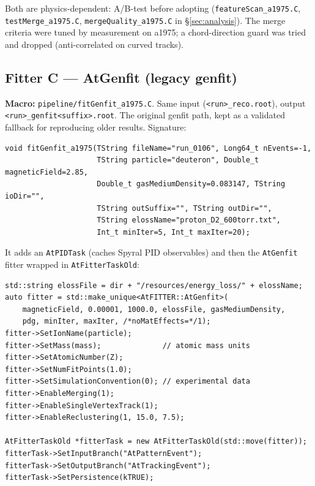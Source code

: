 \documentclass[11pt,a4paper]{article}
\newcommand{\code}[1]{\texttt{\small #1}}
\newcommand{\file}[1]{\texttt{\small #1}}
\begin{document}
\begin{warnbox}
Both are physics-dependent: A/B-test before adopting (\file{featureScan\_a1975.C},
\file{testMerge\_a1975.C}, \file{mergeQuality\_a1975.C} in \S\ref{sec:analysis}).
The merge criteria were tuned by measurement on a1975; a chord-direction guard
was tried and dropped (anti-correlated on curved tracks).
\end{warnbox}

\subsection{Fitter C --- AtGenfit (legacy genfit)}

\textbf{Macro:} \file{pipeline/\allowbreak fitGenfit\_a1975.C}. Same input
(\file{<run>\_reco.root}), output \file{<run>\_genfit<suffix>.root}. The original
genfit path, kept as a validated fallback for reproducing older results. Signature:

\begin{lstlisting}
void fitGenfit_a1975(TString fileName="run_0106", Long64_t nEvents=-1,
                     TString particle="deuteron", Double_t magneticField=2.85,
                     Double_t gasMediumDensity=0.083147, TString ioDir="",
                     TString outSuffix="", TString outDir="",
                     TString elossName="proton_D2_600torr.txt",
                     Int_t minIter=5, Int_t maxIter=20);
\end{lstlisting}

It adds an \code{AtPIDTask} (caches Spyral PID observables) and then the
\code{AtGenfit} fitter wrapped in \code{AtFitterTaskOld}:

\begin{lstlisting}
std::string elossFile = dir + "/resources/energy_loss/" + elossName;
auto fitter = std::make_unique<AtFITTER::AtGenfit>(
    magneticField, 0.00001, 1000.0, elossFile, gasMediumDensity,
    pdg, minIter, maxIter, /*noMatEffects=*/1);
fitter->SetIonName(particle);
fitter->SetMass(mass);              // atomic mass units
fitter->SetAtomicNumber(Z);
fitter->SetNumFitPoints(1.0);
fitter->SetSimulationConvention(0); // experimental data
fitter->EnableMerging(1);
fitter->EnableSingleVertexTrack(1);
fitter->EnableReclustering(1, 15.0, 7.5);

AtFitterTaskOld *fitterTask = new AtFitterTaskOld(std::move(fitter));
fitterTask->SetInputBranch("AtPatternEvent");
fitterTask->SetOutputBranch("AtTrackingEvent");
fitterTask->SetPersistence(kTRUE);
\end{lstlisting}
\end{document}
